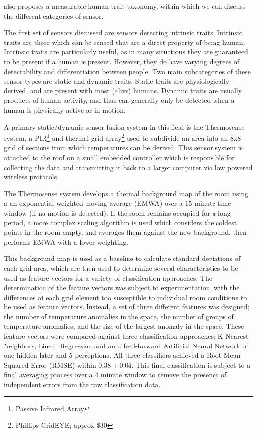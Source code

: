 \documentclass[../thesis/thesis.tex]{subfiles}
\begin{document}
\cite{teixeira2010survey} also proposes a measurable human trait taxonomy, within which we can discuss the different categories of sensor.

The first set of sensors discussed are sensors detecting intrinsic traits. Intrinsic traits are those which can be sensed that are a direct property of being human. Intrinsic traits are particularly useful, as in many situations they are guaranteed to be present if a human is present. However, they do have varying degrees of detectability and differentiation between people. Two main subcategories of these sensor types are static and dynamic traits. Static traits are physiologically derived, and are present with most (alive) humans. Dynamic traits are usually products of human activity, and thus can generally only be detected when a human is physically active or in motion.

A primary static/dynamic sensor fusion system in this field is the Thermosense system, \cite{erickson2013thermosense} a PIR\footnote{Passive Infrared Array} and thermal grid array\footnote{Phillips GridEYE; approx \$30} used to subdivide an area into an 8x8 grid of sections from which temperatures can be derived. This sensor system is attached to the roof on a small embedded controller which is responsible for collecting the data and transmitting it back to a larger computer via low powered wireless protocols.

The Thermosense system develops a thermal background map of the room using a an exponential weighted moving average (EMWA) over a 15 minute time window (if no motion is detected). If the room remains occupied for a long period, a more complex scaling algorithm is used which considers the coldest points in the room empty, and averages them against the new background, then performs EMWA with a lower weighting.

This background map is used as a baseline to calculate standard deviations of each grid area, which are then used to determine several characteristics to be used as feature vectors for a variety of classification approaches. The determination of the feature vectors was subject to experimentation, with the differences at each grid element too susceptible to individual room conditions to be used as feature vectors. Instead, a set of three different features was designed; the number of temperature anomalies in the space, the number of groups of temperature anomalies, and the size of the largest anomaly in the space. These feature vectors were compared against three classification approaches; K-Nearest Neighbors, Linear Regression and an a feed-forward Artificial Neural Network of one hidden later and 5 perceptions. All three classifiers achieved a Root Mean Squared Error (RMSE) within $0.38\pm0.04$. This final classification is subject to a final averaging process over a 4 minute window to remove the presence of independent errors from the raw classification data.
\end{document}
